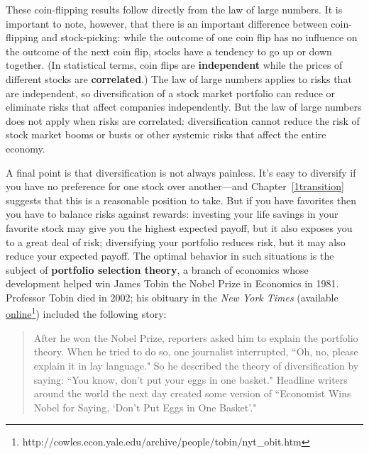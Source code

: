 These coin-flipping results follow directly from the law of large numbers. It is important to note, however, that there is an important difference between coin-flipping and stock-picking: while the outcome of one coin flip has no influence on the outcome of the next coin flip, stocks have a tendency to go up or down together. (In statistical terms, coin flips are \textbf{independent} while the prices of different stocks are \textbf{correlated}.) The law of large numbers applies to risks that are independent, so diversification of a stock market portfolio can reduce or eliminate risks that affect companies independently. But the law of large numbers does not apply when risks are correlated: diversification cannot reduce the risk of stock market booms or busts or other systemic risks that affect the entire economy.

A final point is that diversification is not always painless. It's easy to diversify if you have no preference for one stock over another---and Chapter~\ref{1transition} suggests that this is a reasonable position to take. But if you have favorites then you have to balance risks against rewards: investing your life savings in your favorite stock may give you the highest expected payoff, but it also exposes you to a great deal of risk; diversifying your portfolio reduces risk, but it may also reduce your expected payoff. The optimal behavior in such situations is the subject of \textbf{portfolio selection theory}, a branch of economics whose development helped win James Tobin the Nobel Prize in Economics in 1981. Professor Tobin died in 2002; his  obituary in the \emph{New York Times} (available  \href{http://cowles.econ.yale.edu/archive/people/tobin/nyt_obit.htm}{online}\footnote{http://cowles.econ.yale.edu/archive/people/tobin/nyt\_obit.htm}) included the following story:
\begin{quote}
After he won the Nobel Prize, reporters asked him to explain the portfolio theory. When he tried to do so, one journalist interrupted, ``Oh, no, please explain it in lay language." So he described the theory of diversification by saying: ``You know, don't put your eggs in one basket." Headline writers around the world the next day created some version of ``Economist Wins Nobel for Saying, `Don't Put Eggs in One Basket'."
\end{quote}



